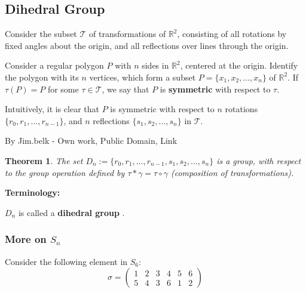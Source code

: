 \documentclass[a4paper,12pt]{report}
\newcounter{statement}
\numberwithin{statement}{chapter}
\newtheorem{thm}[statement]{Theorem}
\numberwithin{equation}{chapter}
\numberwithin{section}{chapter}
\numberwithin{subsection}{section}
\begin{document}
\subsection*{Dihedral Group}

Consider the subset $\mathcal{T}$ of transformations of $\mathbb{R}^2$,
consisting of all rotations by fixed angles about the origin, and all reflections over lines through the origin.




Consider a regular polygon $P$ with $n$ sides in $\mathbb{R}^2$, centered at the origin.
Identify the polygon with its $n$ vertices, which form a subset $P = \{x_1, x_2, \ldots, x_n\}$
of $\mathbb{R}^2$.  If $\tau(P) = P$ for some $\tau \in \mathcal{T}$, we say that $P$ is  {\bf symmetric} 
with respect to $\tau$.




Intuitively, it is clear that $P$ is symmetric with respect to $n$ rotations $\{r_0, r_1,\ldots, r_{n - 1}\}$,
and $n$ reflections $\{s_1, s_2,\ldots, s_n\}$ in $\mathcal{T}$.









By Jim.belk - Own work, Public Domain, Link







\begin{thm}

The set $D_n := \{r_0, r_1,\ldots, r_{n - 1}, s_1, s_2,\ldots, s_n\}$ is a group,
with respect to the group operation defined by $\tau*\gamma = \tau\circ\gamma$
(composition of transformations).

\end{thm}
 {\bf Terminology:} 

$D_n$ is called a  {\bf dihedral group} .





\subsubsection*{More on $S_n$}




Consider the following element in $S_6$:
\[
\sigma = \left(
\begin{matrix}
1&2&3&4&5&6\\
5&4&3&6&1&2
\end{matrix}
\right)
\]
\end{document}
